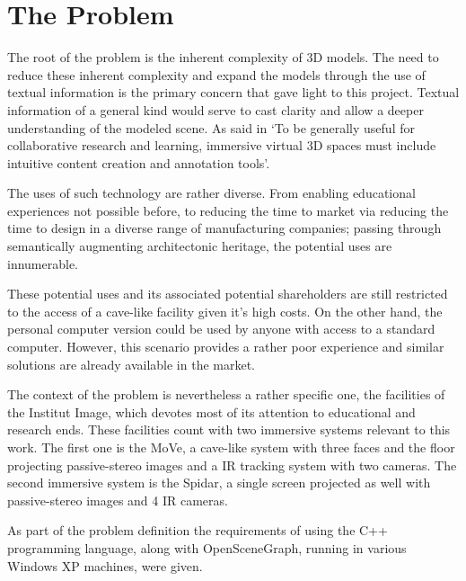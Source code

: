 \section{The Problem}
The root of the problem is the inherent complexity of 3D models. The need to reduce these inherent complexity and expand the models through the use of textual information is the primary concern that gave light to this project. Textual information of a general kind would serve to cast clarity and allow a deeper understanding of the modeled scene. As said in \cite{Kadobayashi} `To be generally useful for collaborative research and learning, immersive virtual 3D spaces must include intuitive content creation and annotation tools'.

The uses of such technology are rather diverse. From enabling educational experiences not possible before, to reducing the time to market via reducing the time to design in a diverse range of manufacturing companies; passing through semantically augmenting architectonic heritage, the potential uses are innumerable.

These potential uses and its associated potential shareholders are still restricted to the access of a cave-like facility given it's high costs. On the other hand, the personal computer version could be used by anyone with access to a standard computer. However, this scenario provides a rather poor experience and similar solutions are already available in the market.

The context of the problem is nevertheless a rather specific one, the facilities of the Institut Image, which devotes most of its attention to educational and research ends. These facilities count with two immersive systems relevant to this work. The first one is the MoVe, a cave-like system with three faces and the floor projecting passive-stereo  images and a IR tracking system with two cameras. The second immersive system is the Spidar, a single screen projected as well with passive-stereo images and 4 IR cameras. 

As part of the problem definition the requirements of using the C++ programming language, along with OpenSceneGraph, running in various Windows XP machines, were given.
